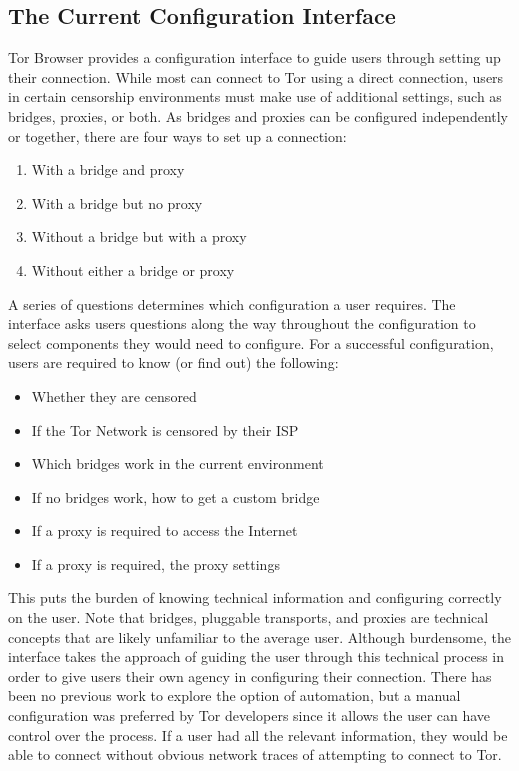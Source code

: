 \documentclass[USenglish,oneside,twocolumn]{article}
\begin{document}
\subsection{The Current Configuration Interface} 
Tor Browser provides a configuration interface to guide users through setting up 
their connection. While most can connect to Tor using a direct connection, users in certain censorship environments must
make use of additional settings, such as bridges, proxies, or both. As bridges and proxies can be configured independently or together, there are four ways to set up a connection:\\

\begin{enumerate}
    \item With a bridge and proxy
    \item With a bridge but no proxy
    \item Without a bridge but with a proxy
    \item Without either a bridge or proxy
\end{enumerate}

A series of questions determines which configuration a user requires. The interface asks users questions along the way throughout the configuration to select components they would need to configure. For a successful configuration, users are required to know (or find out) the following:\\

\begin{itemize}
	\item{Whether they are censored} 
	\item{If the Tor Network is censored by their ISP}
	\item{Which bridges work in the current environment} 
	\item{If no bridges work, how to get a custom bridge} 
	\item{If a proxy is required to access the Internet}
	\item{If a proxy is required, the proxy settings}
\end{itemize}

This puts the burden of knowing technical information and configuring correctly on the user. Note that bridges, pluggable transports, and proxies are technical concepts that are likely unfamiliar to the average user. Although burdensome, the interface takes the approach of guiding the user through this technical process in order to give users their own agency in configuring their connection. There has been no previous work to explore the option of automation, but a manual configuration was preferred by Tor developers since it allows the user can have control over the process. If a user had all the relevant information, they would be able to connect without obvious network traces of attempting to connect to Tor. 
\end{document}
